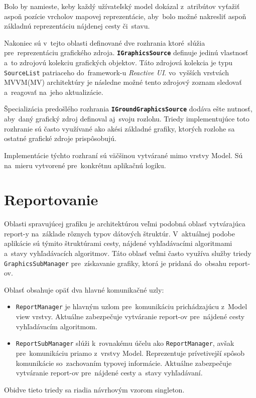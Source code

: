 Bolo by namieste, keby každý užívateľský model dokázal z~atribútov vyťažiť aspoň pozície vrcholov mapovej reprezentácie, aby~bolo možné nakresliť aspoň základnú reprezentáciu nájdenej cesty či~stavu. 

\bigskip

Nakoniec sú v~tejto oblasti definované dve rozhrania ktoré~slúžia pre~reprezentáciu grafického zdroja. \textbf{\texttt{IGraphicsSource}} definuje jedinú vlastnosť a~to zdrojovú kolekciu grafických objektov. Táto zdrojová kolekcia je typu \texttt{SourceList} patriaceho do~framework-u \textit{Reactive UI}. vo~vyšších vrstvách MVVM(MV) architektúry je následne možné tento zdrojový zoznam sledovať a~reagovať na~jeho aktualizácie. 

Špecializácia predošlého rozhrania \textbf{\texttt{IGroundGraphicsSource}} dodáva ešte nutnosť, aby~daný grafický zdroj definoval aj~svoju rozlohu. Triedy implementujúce toto rozhranie sú často využívané ako akési základné grafiky, ktorých rozlohe sa ostatné grafické zdroje prispôsobujú.

Implementácie týchto rozhraní sú väčšinou vytvárané mimo vrstvy Model. Sú na~mieru vytvorené pre~konkrétnu aplikačnú logiku. 

\section{Reportovanie}

Oblasti spravujúcej grafiku je architektúrou veľmi podobná oblasť vytvárajúca report-y na~základe rôznych typov dátových štruktúr. V~aktuálnej podobe aplikácie sú týmito štruktúrami cesty, nájdené vyhľadávacími algoritmami a~stavy vyhľadávacích algoritmov. Táto oblasť veľmi často využíva služby triedy \texttt{GraphicsSubManager} pre~získavanie grafiky, ktorá je pridaná do~obsahu report-ov.

Oblasť obsahuje opäť dva hlavné komunikačné uzly:
\begin{itemize}
    \item \texttt{ReportManager} je hlavným uzlom pre~komunikáciu prichádzajúcu z~Model view vrstvy. Aktuálne zabezpečuje vytváranie report-ov pre~nájdené cesty vyhľadávacím algoritmom.
    \item \texttt{ReportSubManager} slúži k~rovnakému účelu ako \texttt{ReportManager}, avšak pre~komunikáciu priamo z~vrstvy Model. Reprezentuje prívetivejší spôsob komunikácie so~zachovaním typovej informácie. Aktuálne zabezpečuje vytváranie report-ov pre~nájdené cesty a~stavy vyhľadávaní.
\end{itemize}
Obidve tieto triedy sa riadia návrhovým vzorom singleton.

